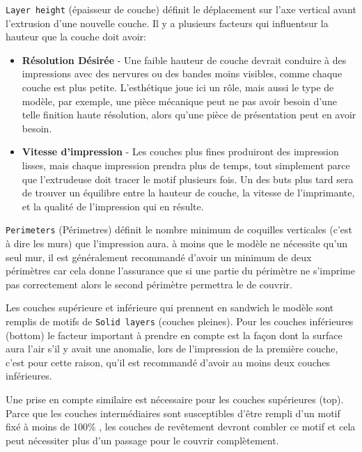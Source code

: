 \texttt{Layer height} (\'epaisseur de couche) d\'efinit le d\'eplacement sur l'axe vertical avant l'extrusion d'une nouvelle couche.  Il y a plusieurs facteurs qui influentsur la hauteur que la couche doit avoir:
\begin{itemize}
	\item \textbf{R\'esolution D\'esir\'ee}  - Une faible hauteur de couche devrait conduire \`a des impressions avec des nervures ou des bandes moins visibles, comme chaque couche est plus petite. L'esth\'etique joue ici un r\^ole, mais aussi le type de mod\`ele, par exemple, une pi\`ece m\'ecanique peut ne pas avoir besoin d'une telle finition haute r\'esolution, alors qu'une pi\`ece de pr\'esentation peut en avoir besoin.
	\item \textbf{Vitesse d'impression}  - Les couches plus fines produiront des impression lisses, mais chaque impression prendra plus de temps, tout simplement parce que l'extrudeuse doit tracer le motif plusieurs fois. Un des buts plus tard sera de trouver un \'equilibre entre la hauteur de couche, la vitesse de l'imprimante, et la qualit\'e de l'impression qui en r\'esulte.
\end{itemize}
\texttt{Perimeters} (P\'erimetres) d\'efinit le nombre minimum de coquilles verticales (c'est \`a dire les murs) que l'impression aura. \`a moins que le mod\`ele ne n\'ecessite qu'un seul mur, il est g\'en\'eralement recommand\'e d'avoir un minimum de deux p\'erim\`etres car cela donne l'assurance que si une partie du p\'erim\`etre ne s'imprime pas correctement alors le second p\'erim\`etre permettra le de couvrir.

Les couches sup\'erieure et inf\'erieure qui prennent en sandwich le mod\`ele sont remplis de motifs de \texttt{Solid layers} (couches pleines). Pour les couches inf\'erieures (bottom) le facteur important \`a prendre en compte est la façon dont la surface aura l'air s'il y avait une anomalie, lors de l'impression de la premi\`ere couche, c'est pour cette raison, qu'il est recommand\'e d'avoir au moins deux couches inf\'erieures.

Une prise en compte similaire est n\'ecessaire pour les couches sup\'erieures (top). Parce que les couches interm\'ediaires sont susceptibles d'\^etre rempli d'un motif fix\'e \`a moins de 100\% , les couches de rev\^etement devront combler ce motif et cela peut n\'ecessiter plus d'un passage pour le couvrir compl\`etement.

